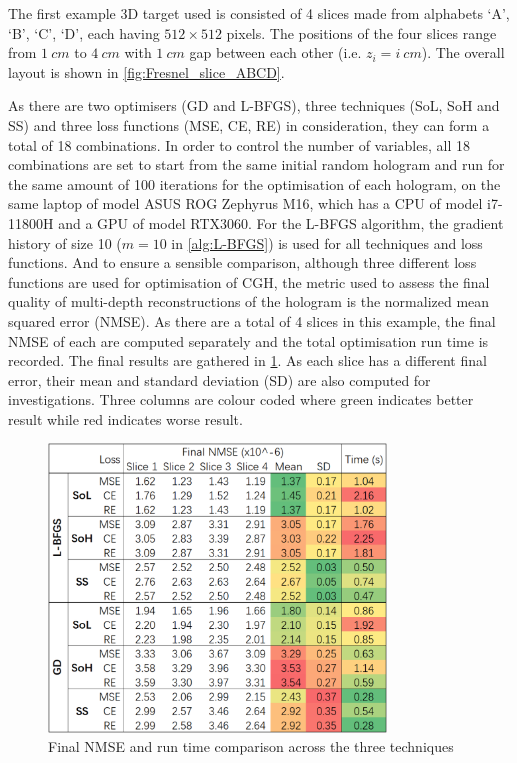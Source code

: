The first example 3D target used is consisted of 4 slices made from alphabets `A', `B', `C', `D', each having $512\times512$ pixels. The positions of the four slices range from $1\ cm$ to $4\ cm$ with $1\ cm$ gap between each other (i.e. $z_i=i\ cm$). The overall layout is shown in \cref{fig:Fresnel_slice_ABCD}.

As there are two optimisers (GD and L-BFGS), three techniques (SoL, SoH and SS) and three loss functions (MSE, CE, RE) in consideration, they can form a total of 18 combinations. In order to control the number of variables, all 18 combinations are set to start from the same initial random hologram and run for the same amount of 100 iterations for the optimisation of each hologram, on the same laptop of model ASUS ROG Zephyrus M16, which has a CPU of model i7-11800H and a GPU of model RTX3060. For the L-BFGS algorithm, the gradient history of size 10 ($m=10$ in \cref{alg:L-BFGS}) is used for all techniques and loss functions. And to ensure a sensible comparison, although three different loss functions are used for optimisation of CGH, the metric used to assess the final quality of multi-depth reconstructions of the hologram is the normalized mean squared error (NMSE). As there are a total of 4 slices in this example, the final NMSE of each are computed separately and the total optimisation run time is recorded. The final results are gathered in \cref{fig:Technique_Loss_comparison}. As each slice has a different final error, their mean and standard deviation (SD) are also computed for investigations. Three columns are colour coded where green indicates better result while red indicates worse result.

\begin{figure}[H]
	\centering
	\includegraphics[width=0.8\textwidth]{Technique_Loss_comparison}
	\caption{Final NMSE and run time comparison across the three techniques}
	\label{fig:Technique_Loss_comparison}
\end{figure}

